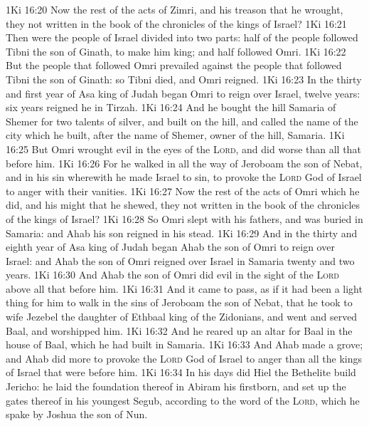 \vs 1Ki 16:20 Now the rest of the acts of Zimri, and his treason that he wrought,  they not written in the book of the chronicles of the kings of Israel?
\vs 1Ki 16:21 Then were the people of Israel divided into two parts: half of the people followed Tibni the son of Ginath, to make him king; and half followed Omri.
\vs 1Ki 16:22 But the people that followed Omri prevailed against the people that followed Tibni the son of Ginath: so Tibni died, and Omri reigned.
\vs 1Ki 16:23 In the thirty and first year of Asa king of Judah began Omri to reign over Israel, twelve years: six years reigned he in Tirzah.
\vs 1Ki 16:24 And he bought the hill Samaria of Shemer for two talents of silver, and built on the hill, and called the name of the city which he built, after the name of Shemer, owner of the hill, Samaria.
\vs 1Ki 16:25 But Omri wrought evil in the eyes of the \textsc{Lord}, and did worse than all that  before him.
\vs 1Ki 16:26 For he walked in all the way of Jeroboam the son of Nebat, and in his sin wherewith he made Israel to sin, to provoke the \textsc{Lord} God of Israel to anger with their vanities.
\vs 1Ki 16:27 Now the rest of the acts of Omri which he did, and his might that he shewed,  they not written in the book of the chronicles of the kings of Israel?
\vs 1Ki 16:28 So Omri slept with his fathers, and was buried in Samaria: and Ahab his son reigned in his stead.
\vs 1Ki 16:29 And in the thirty and eighth year of Asa king of Judah began Ahab the son of Omri to reign over Israel: and Ahab the son of Omri reigned over Israel in Samaria twenty and two years.
\vs 1Ki 16:30 And Ahab the son of Omri did evil in the sight of the \textsc{Lord} above all that  before him.
\vs 1Ki 16:31 And it came to pass, as if it had been a light thing for him to walk in the sins of Jeroboam the son of Nebat, that he took to wife Jezebel the daughter of Ethbaal king of the Zidonians, and went and served Baal, and worshipped him.
\vs 1Ki 16:32 And he reared up an altar for Baal in the house of Baal, which he had built in Samaria.
\vs 1Ki 16:33 And Ahab made a grove; and Ahab did more to provoke the \textsc{Lord} God of Israel to anger than all the kings of Israel that were before him.
\vs 1Ki 16:34 In his days did Hiel the Bethelite build Jericho: he laid the foundation thereof in Abiram his firstborn, and set up the gates thereof in his youngest  Segub, according to the word of the \textsc{Lord}, which he spake by Joshua the son of Nun.
